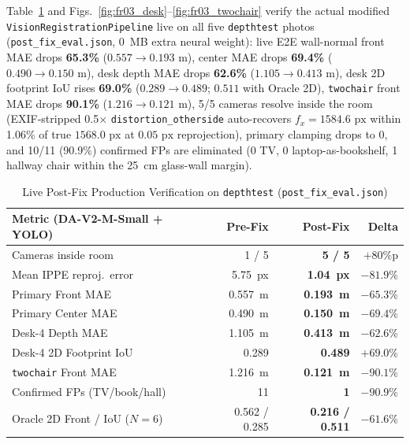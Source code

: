 \documentclass[conference]{IEEEtran}
\begin{document}
Table~\ref{tab:depthtest_postfix} and Figs.~\ref{fig:fr03_desk}--\ref{fig:fr03_twochair} verify the actual modified \texttt{VisionRegistrationPipeline} live on all five \texttt{depthtest} photos (\texttt{post\_fix\_eval.json}, 0~MB extra neural weight): live E2E wall-normal front MAE drops \textbf{65.3\%} ($0.557 \to 0.193\text{ m}$), center MAE drops \textbf{69.4\%} ($0.490 \to 0.150\text{ m}$), desk depth MAE drops \textbf{62.6\%} ($1.105 \to 0.413\text{ m}$), desk 2D footprint IoU rises \textbf{69.0\%} ($0.289 \to 0.489$; $0.511$ with Oracle 2D), \texttt{twochair} front MAE drops \textbf{90.1\%} ($1.216 \to 0.121\text{ m}$), 5/5 cameras resolve inside the room (EXIF-stripped 0.5$\times$ \texttt{distortion\_otherside} auto-recovers $f_x = 1584.6\text{ px}$ within 1.06\% of true $1568.0\text{ px}$ at $0.05\text{ px}$ reprojection), primary clamping drops to 0, and 10/11 (90.9\%) confirmed FPs are eliminated (0 TV, 0 laptop-as-bookshelf, 1 hallway chair within the 25~cm glass-wall margin).

\begin{table}[!tb]
\caption{Live Post-Fix Production Verification on \texttt{depthtest} (\texttt{post\_fix\_eval.json})}
\label{tab:depthtest_postfix}
\centering
\scriptsize
\setlength{\tabcolsep}{3.0pt}
\renewcommand{\arraystretch}{1.08}
\begin{tabular}{@{}lrrr@{}}
\toprule
\textbf{Metric (DA-V2-M-Small + YOLO)} & \textbf{Pre-Fix} & \textbf{Post-Fix} & \textbf{Delta} \\
\midrule
Cameras inside room & 1 / 5 & \textbf{5 / 5} & $+80\%$p \\
Mean IPPE reproj.\ error & 5.75~px & \textbf{1.04~px} & $-81.9\%$ \\
Primary Front MAE & 0.557~m & \textbf{0.193~m} & $\mathbf{-65.3\%}$ \\
Primary Center MAE & 0.490~m & \textbf{0.150~m} & $\mathbf{-69.4\%}$ \\
Desk-4 Depth MAE & 1.105~m & \textbf{0.413~m} & $\mathbf{-62.6\%}$ \\
Desk-4 2D Footprint IoU & 0.289 & \textbf{0.489} & $\mathbf{+69.0\%}$ \\
\texttt{twochair} Front MAE & 1.216~m & \textbf{0.121~m} & $\mathbf{-90.1\%}$ \\
Confirmed FPs (TV/book/hall) & 11 & \textbf{1} & $\mathbf{-90.9\%}$ \\
Oracle 2D Front / IoU ($N=6$) & 0.562 / 0.285 & \textbf{0.216 / 0.511} & $-61.6\%$ \\
\bottomrule
\end{tabular}
\end{table}
\end{document}
